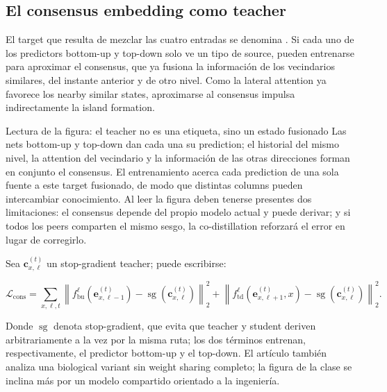 \subsection{El consensus embedding como teacher}

El target que resulta de mezclar las cuatro entradas se denomina . Si cada uno de los predictors bottom-up y top-down solo ve un tipo de source, pueden entrenarse para aproximar el consensus, que ya fusiona la información de los vecindarios similares, del instante anterior y de otro nivel. Como la lateral attention ya favorece los nearby similar states, aproximarse al consensus impulsa indirectamente la island formation.


\begin{knowledgebox}{Lectura de la figura: el teacher no es una etiqueta, sino un estado fusionado}
Las nets bottom-up y top-down dan cada una su prediction; el historial del mismo nivel, la attention del vecindario y la información de las otras direcciones forman en conjunto el consensus. El entrenamiento acerca cada prediction de una sola fuente a este target fusionado, de modo que distintas columns pueden intercambiar conocimiento. Al leer la figura deben tenerse presentes dos limitaciones: el consensus depende del propio modelo actual y puede derivar; y si todos los peers comparten el mismo sesgo, la co-distillation reforzará el error en lugar de corregirlo.
\end{knowledgebox}

Sea $\mathbf c_{x,\ell}^{(t)}$ un stop-gradient teacher; puede escribirse:

\[
\mathcal L_{\mathrm{cons}}=
\sum_{x,\ell,t}
\left\|
f_{\mathrm{bu}}^{\ell}\!\left(\mathbf e_{x,\ell-1}^{(t)}\right)
-\operatorname{sg}\!\left(\mathbf c_{x,\ell}^{(t)}\right)
\right\|_2^2
+
\left\|
f_{\mathrm{td}}^{\ell}\!\left(\mathbf e_{x,\ell+1}^{(t)},x\right)
-\operatorname{sg}\!\left(\mathbf c_{x,\ell}^{(t)}\right)
\right\|_2^2.
\]

Donde $\operatorname{sg}$ denota stop-gradient, que evita que teacher y student deriven arbitrariamente a la vez por la misma ruta; los dos términos entrenan, respectivamente, el predictor bottom-up y el top-down. El artículo también analiza una biological variant sin weight sharing completo; la figura de la clase se inclina más por un modelo compartido orientado a la ingeniería.

